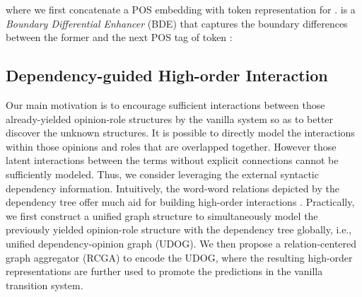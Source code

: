 \documentclass[letterpaper]{article} \usepackage{aaai22}  \usepackage{times}  \usepackage{helvet}  \usepackage{courier}  \usepackage[hyphens]{url}  \usepackage{graphicx} \urlstyle{rm} \def\UrlFont{\rm}  \usepackage{natbib}  \usepackage{caption} \DeclareCaptionStyle{ruled}{labelfont=normalfont,labelsep=colon,strut=off} \frenchspacing  \setlength{\pdfpagewidth}{8.5in}  \setlength{\pdfpageheight}{11in}  \usepackage{algorithm}
\begin{document}
where we first concatenate a POS embedding  with token representation  for . 
 is a \emph{Boundary Differential Enhancer} (BDE) that captures the boundary differences between the former and the next POS tag of token :















\subsection{Dependency-guided High-order Interaction}

Our main motivation is to encourage sufficient interactions between those already-yielded opinion-role structures by the vanilla system so as to better discover the unknown structures.
It is possible to directly model the interactions within those opinions and roles that are overlapped together.
However those latent interactions between the terms without explicit connections cannot be sufficiently modeled.
Thus, we consider leveraging the external syntactic dependency information.
Intuitively, the word-word relations depicted by the dependency tree offer much aid for building high-order interactions \cite{li-etal-2020-high}.
Practically, we first construct a unified graph structure to simultaneously model the previously yielded opinion-role structure with the dependency tree globally, i.e., unified dependency-opinion graph (UDOG).
We then propose a relation-centered graph aggregator (RCGA) to encode the UDOG, where the resulting high-order representations are further used to promote the predictions in the vanilla transition system.
\end{document}

